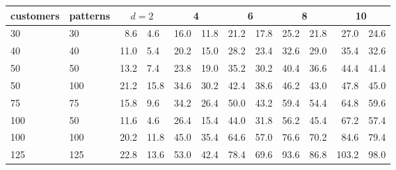 \begin{tabular}{@{}llr@{\,/\,}lr@{\,/\,}lr@{\,/\,}lr@{\,/\,}lr@{\,/\,}l@{}}
\toprule
customers & patterns & \multicolumn{2}{c}{$d=2$} & \multicolumn{2}{c}{4} & \multicolumn{2}{c}{6} & \multicolumn{2}{c}{8} & \multicolumn{2}{c}{10} \\
\midrule
30 & 30 & 8.6 & 4.6 & 16.0 & 11.8 & 21.2 & 17.8 & 25.2 & 21.8 & 27.0 & 24.6 \\
40 & 40 & 11.0 & 5.4 & 20.2 & 15.0 & 28.2 & 23.4 & 32.6 & 29.0 & 35.4 & 32.6 \\
50 & 50 & 13.2 & 7.4 & 23.8 & 19.0 & 35.2 & 30.2 & 40.4 & 36.6 & 44.4 & 41.4 \\
50 & 100 & 21.2 & 15.8 & 34.6 & 30.2 & 42.4 & 38.6 & 46.2 & 43.0 & 47.8 & 45.0 \\
75 & 75 & 15.8 & 9.6 & 34.2 & 26.4 & 50.0 & 43.2 & 59.4 & 54.4 & 64.8 & 59.6 \\
100 & 50 & 11.6 & 4.6 & 26.4 & 15.4 & 44.0 & 31.8 & 56.2 & 45.4 & 67.2 & 57.4 \\
100 & 100 & 20.2 & 11.8 & 45.0 & 35.4 & 64.6 & 57.0 & 76.6 & 70.2 & 84.6 & 79.4 \\
125 & 125 & 22.8 & 13.6 & 53.0 & 42.4 & 78.4 & 69.6 & 93.6 & 86.8 & 103.2 & 98.0 \\
\bottomrule
\end{tabular}
